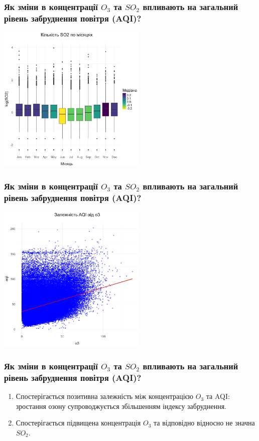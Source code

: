 \documentclass{beamer}
\begin{document}
\begin{frame}
  \frametitle{Як зміни в концентрації $O_3$ та $SO_2$ впливають на загальний рівень забруднення повітря (AQI)?}

  \begin{center}
    \includegraphics[height=2.8in]{plots/question2/seasonal_so2.png}
  \end{center}
\end{frame}

\begin{frame}
  \frametitle{Як зміни в концентрації $O_3$ та $SO_2$ впливають на загальний рівень забруднення повітря (AQI)?}

  \begin{center}
    \includegraphics[height=2.8in]{plots/question2/scatter_plot.png}
  \end{center}
\end{frame}

\begin{frame}
  \frametitle{Як зміни в концентрації $O_3$ та $SO_2$ впливають на загальний рівень забруднення повітря (AQI)?}

  \begin{enumerate}
    \item Спостерігається позитивна залежність між концентрацією $O_3$ та AQI: зростання озону супроводжується збільшенням індексу забруднення.
    \item Спостерігається підвищена концентрація $O_3$ та відповідно відносно не значна $SO_2$.
  \end{enumerate}
\end{frame}
\end{document}
